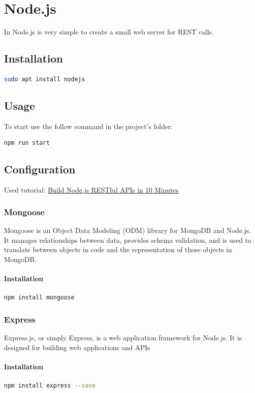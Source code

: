\documentclass[12pt, a4paper, portrait]{article}
\begin{document}
\pagebreak
\section{Node.js}
In Node.js is very simple to create a small web server for REST calls.
\subsection{Installation}
\begin{lstlisting}[language=bash]
sudo apt install nodejs
\end{lstlisting}
\subsection{Usage}
To start use the follow command in the project's folder:
\begin{lstlisting}[language=bash]
npm run start
\end{lstlisting}
\subsection{Configuration}
Used tutorial: \href{https://www.codementor.io/olatundegaruba/nodejs-restful-apis-in-10-minutes-q0sgsfhbd}{Build Node.js RESTful APIs in 10 Minutes}
\subsubsection{Mongoose}
Mongoose is an Object Data Modeling (ODM) library for MongoDB and Node.js. It manages relationships between data, provides schema validation, and is used to translate between objects in code and the representation of those objects in MongoDB.
\paragraph{Installation}
\begin{lstlisting}[language=bash]
npm install mongoose
\end{lstlisting}
\subsubsection{Express}
Express.js, or simply Express, is a web application framework for Node.js. It is designed for building web applications and APIs
\paragraph{Installation}
\begin{lstlisting}[language=bash]
npm install express --save
\end{lstlisting}
\end{document}
